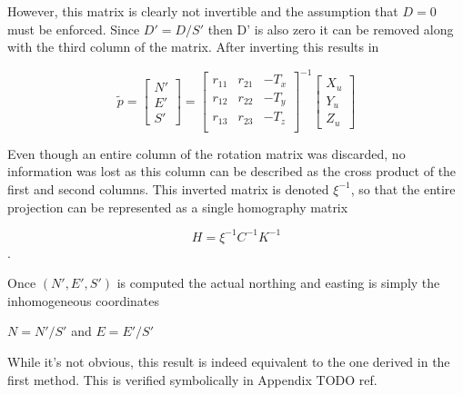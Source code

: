   However, this matrix is clearly not invertible and the assumption that $D=0$ must be enforced.  Since $D'=D/S'$ then D' is also zero it can be removed along with the third column of the matrix.   After inverting this results in 
  
  \[
    \tilde{p} =
    \begin{bmatrix} N' \\ E' \\ S' \end{bmatrix}
      = 
    \begin{bmatrix} r_{11} & r_{21} & -T_x \\
                    r_{12} & r_{22} & -T_y \\
                    r_{13} & r_{23} & -T_z \\
    \end{bmatrix}^{-1}
    \begin{bmatrix} X_u \\ Y_u \\ Z_u \end{bmatrix}
  \]
 
  Even though an entire column of the rotation matrix was discarded, no information was lost as this column can be described as the cross product of the first and second columns.  This inverted matrix is denoted $\xi^{-1}$, so that the entire projection can be represented as a single homography matrix
  
 \[ 
 H = \xi^{-1} C^{-1} K^{-1} 
 \].
 
 Once $(N',E',S')$ is computed the actual northing and easting is simply the inhomogeneous coordinates
 
 \begin{center}
 $N=N'/S'$ and $E=E'/S'$
 \end{center}
 
 While it's not obvious, this result is indeed equivalent to the one derived in the first method.  This is verified symbolically in Appendix {TODO ref}.  
